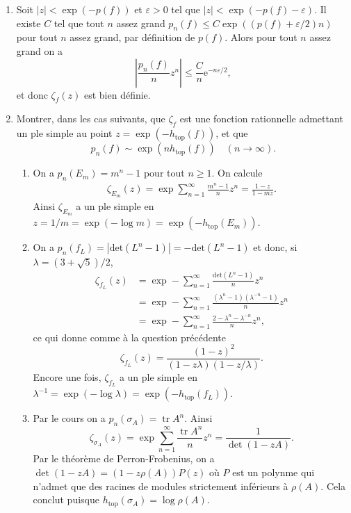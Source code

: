 \documentclass[a4paper,12pt,openany]{article}
\theoremstyle{plain}
\theoremstyle{definition}
\newcommand{\e}{\mathrm{e}}
\DeclareMathOperator{\tr}{tr}
\newcommand{\htop}{h_\mathrm{top}}
\begin{document}
\vspace{0.6cm}

 \vspace{1.5mm} 

\noindent

\begin{enumerate}
\item Soit $|z|<\exp(-p(f))$ et $\varepsilon > 0$ tel que $|z|<\exp(-p(f)-\varepsilon)$. Il existe $C$ tel que tout $n$ assez grand $p_n(f) \leq C \exp((p(f) + \varepsilon/2)n)$ pour tout $n$ assez grand, par d\'efinition de $p(f)$. Alors pour tout $n$ assez grand on a
$$
\left|\frac{p_n(f)}{n}z^n\right| \leq \frac{C}{n} \e^{-n\varepsilon/2},
$$
et donc $\zeta_f(z)$ est bien d\'efinie.
\item Montrer, dans les cas suivants, que $\zeta_f$ est une fonction rationnelle admettant un ple simple au point $z = \exp \left(-h_\mathrm{top}(f)\right)$, et que
$$
p_n(f) \sim \exp\left(n\htop(f)\right) \quad (n \to \infty).
$$
\begin{enumerate}
\item On a $p_n(E_m) = m^n-1$ pour tout $n \geq 1$. On calcule
$$
\begin{aligned}
\zeta_{E_m}(z) = \exp \sum_{n=1}^\infty \frac{m^n-1}{n}z^n 
= \frac{1-z}{1-mz}.
\end{aligned}
$$
Ainsi $\zeta_{E_m}$ a un ple simple en $z = 1/m = \exp(-\log m) = \exp(-\htop(E_m))$.

\item On a $p_n(f_L) = |\mathrm{det}(L^n-1)| = -\mathrm{det}(L^n-1)$ et donc, si $\lambda = (3+\sqrt{5})/2$,
$$
\begin{aligned}
\zeta_{f_L}(z) &= \exp -\sum_{n=1}^\infty \frac{\mathrm{det}(L^n-1)}{n} z^n \\
&= \exp -\sum_{n=1}^\infty \frac{(\lambda^n-1)(\lambda^{-n}-1)}{n} z^n \\
&= \exp-\sum_{n=1}^\infty \frac{2 - \lambda^n - \lambda^{-n}}{n}z^n,
\end{aligned}
$$
ce qui donne comme \`a la question pr\'ec\'edente
$$
\zeta_{f_L}(z) = \frac{(1-z)^2}{(1-z\lambda)(1-z/\lambda)}.
$$
Encore une fois, $\zeta_{f_L}$ a un ple simple en $\lambda^{-1} = \exp(-\log \lambda) = \exp(-\htop(f_L))$.

\item Par le cours on a $p_n(\sigma_A) = \tr A^n.$ Ainsi
$$
\zeta_{\sigma_A}(z) = \exp \sum_{n=1}^\infty \frac{\tr A^n}{n}z^n = \frac{1}{\det(1-zA)}.
$$
Par le th\'eor\`eme de Perron-Frobenius, on a $\det(1-zA) = (1-z\rho(A))P(z)$ o\`u $P$ est un polynme qui n'admet que des racines de modules strictement inf\'erieurs \`a $\rho(A)$. Cela conclut puisque $\htop(\sigma_A) = \log \rho(A)$. 


\end{enumerate}
\end{enumerate}
\end{document}
